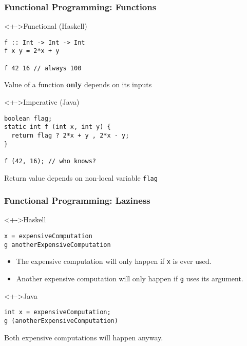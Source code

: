 \documentclass{beamer}
\begin{document}
\begin{frame}[fragile]
  \frametitle{Functional Programming: Functions}
  \begin{block}<+->{Functional (Haskell)}
\begin{verbatim}
f :: Int -> Int -> Int
f x y = 2*x + y

f 42 16 // always 100
\end{verbatim}
    Value of a function \textbf{only} depends on its inputs
  \end{block}
  \begin{block}<+->{Imperative (Java)}
\begin{verbatim}
boolean flag;
static int f (int x, int y) {
  return flag ? 2*x + y , 2*x - y;
}

f (42, 16); // who knows?
\end{verbatim}
    Return value  depends on non-local variable \texttt{flag}
  \end{block}
\end{frame}

\begin{frame}[fragile]
  \frametitle{Functional Programming: Laziness}
  \begin{block}<+->{Haskell}
\begin{verbatim}
x = expensiveComputation
g anotherExpensiveComputation
\end{verbatim}
    \begin{itemize}
    \item The expensive computation will only happen if \texttt{x} is
      ever used.
    \item Another expensive computation will only happen if \texttt{g}
      uses its argument.
    \end{itemize}
  \end{block}
  \begin{block}<+->{Java}
\begin{verbatim}
int x = expensiveComputation;
g (anotherExpensiveComputation)
\end{verbatim}
    Both expensive computations will happen anyway.
  \end{block}
\end{frame}
\end{document}
